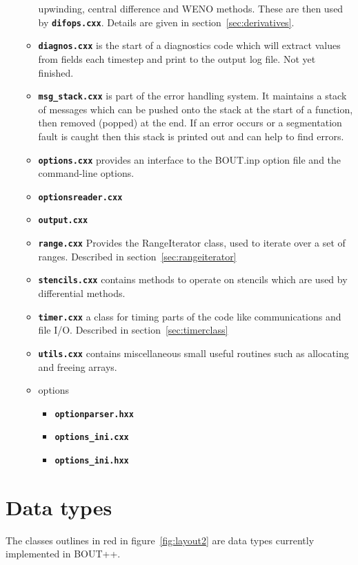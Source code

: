 \documentclass[12pt]{article}
\newcommand{\file}[1]{\texttt{\bf #1}}
\begin{document}
\begin{itemize}
\begin{itemize}
    upwinding, central difference and WENO methods. These are then
    used by \file{difops.cxx}. Details are given in
    section~\ref{sec:derivatives}.
  \item \file{diagnos.cxx} is the start of a diagnostics code which will extract
    values from fields each timestep and print to the output log file. Not
    yet finished.
  \item \file{msg\_stack.cxx} is part of the error handling system. It maintains
    a stack of messages which can be pushed onto the stack at the start of 
    a function, then removed (popped) at the end. If an error occurs or 
    a segmentation fault is caught then this stack is printed out and can
    help to find errors.
  \item \file{options.cxx} provides an interface to the BOUT.inp option file
    and the command-line options.
  \item \file{optionsreader.cxx}
  \item \file{output.cxx}
  \item \file{range.cxx} Provides the RangeIterator class, used to iterate over a set
    of ranges. Described in section~\ref{sec:rangeiterator}
  \item \file{stencils.cxx} contains methods to operate on stencils which are
    used by differential methods. 
  \item \file{timer.cxx} a class for timing parts of the code like communications
    and file I/O. Described in section~\ref{sec:timerclass}
  \item \file{utils.cxx} contains miscellaneous small useful routines
    such as allocating and freeing arrays.
  \item options
    \begin{itemize}
    \item \file{optionparser.hxx}
    \item \file{options\_ini.cxx}
    \item \file{options\_ini.hxx}
    \end{itemize}
  \end{itemize}
\end{itemize}

\section{Data types}

The classes outlines in red in figure~\ref{fig:layout2} are data types 
currently implemented in BOUT++. 
\end{document}
